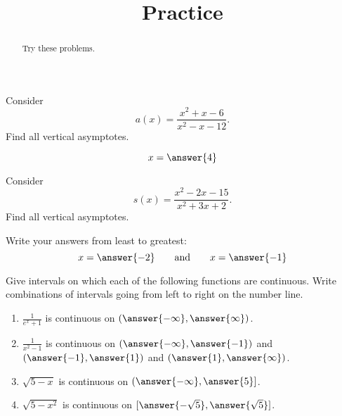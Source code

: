 \documentclass{ximera}
\title{Practice}
\begin{document}
\begin{abstract}
  Try these problems.
\end{abstract}
\maketitle


\begin{exercise}
Consider 
\[a(x) = \frac{x^2+x-6}{x^2-x-12}.
\]
Find all vertical asymptotes.
\begin{prompt}
\begin{multipleChoice}
\end{multipleChoice}
\begin{exercise} 
\[
x=\answer{4}
\]
\end{exercise}
\end{prompt}
\end{exercise}

\begin{exercise}
Consider 
\[s(x) = \frac{x^2-2 x-15}{x^2+3 x+2}.
\]
Find all vertical asymptotes.
\begin{prompt}
\begin{multipleChoice}
\end{multipleChoice}
\begin{exercise}Write your answers from least to greatest:
\[
x=\answer{-2}\qquad\text{and}\qquad x=\answer{-1}
\]
\end{exercise}
\end{prompt}
\end{exercise}


\begin{exercise}



Give intervals on which each of the following functions are
continuous. Write combinations of intervals going from left to right
on the number line.

\begin{enumerate}
\item $\frac{1}{e^x+1}$ is continuous on $(\answer{-\infty},\answer{\infty})$.
\item $\frac{1}{x^2-1}$ is continuous on $(\answer{-\infty},\answer{-1})$ and $(\answer{-1},\answer{1})$ and $(\answer{1},\answer{\infty})$.
\item $\sqrt{5-x}$ is continuous on $(\answer{-\infty},\answer{5}]$.
\item $\sqrt{5-x^2}$ is continuous on $[\answer{-\sqrt{5}},\answer{\sqrt{5}}]$.
\end{enumerate}

\end{exercise}
\end{document}
